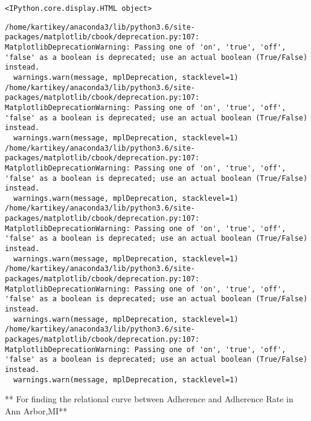 \documentclass[11pt]{article}
\begin{document}
    
    
    \begin{verbatim}
<IPython.core.display.HTML object>
    \end{verbatim}

    
    \begin{Verbatim}[commandchars=\\\{\}]
/home/kartikey/anaconda3/lib/python3.6/site-packages/matplotlib/cbook/deprecation.py:107: MatplotlibDeprecationWarning: Passing one of 'on', 'true', 'off', 'false' as a boolean is deprecated; use an actual boolean (True/False) instead.
  warnings.warn(message, mplDeprecation, stacklevel=1)
/home/kartikey/anaconda3/lib/python3.6/site-packages/matplotlib/cbook/deprecation.py:107: MatplotlibDeprecationWarning: Passing one of 'on', 'true', 'off', 'false' as a boolean is deprecated; use an actual boolean (True/False) instead.
  warnings.warn(message, mplDeprecation, stacklevel=1)
/home/kartikey/anaconda3/lib/python3.6/site-packages/matplotlib/cbook/deprecation.py:107: MatplotlibDeprecationWarning: Passing one of 'on', 'true', 'off', 'false' as a boolean is deprecated; use an actual boolean (True/False) instead.
  warnings.warn(message, mplDeprecation, stacklevel=1)
/home/kartikey/anaconda3/lib/python3.6/site-packages/matplotlib/cbook/deprecation.py:107: MatplotlibDeprecationWarning: Passing one of 'on', 'true', 'off', 'false' as a boolean is deprecated; use an actual boolean (True/False) instead.
  warnings.warn(message, mplDeprecation, stacklevel=1)
/home/kartikey/anaconda3/lib/python3.6/site-packages/matplotlib/cbook/deprecation.py:107: MatplotlibDeprecationWarning: Passing one of 'on', 'true', 'off', 'false' as a boolean is deprecated; use an actual boolean (True/False) instead.
  warnings.warn(message, mplDeprecation, stacklevel=1)
/home/kartikey/anaconda3/lib/python3.6/site-packages/matplotlib/cbook/deprecation.py:107: MatplotlibDeprecationWarning: Passing one of 'on', 'true', 'off', 'false' as a boolean is deprecated; use an actual boolean (True/False) instead.
  warnings.warn(message, mplDeprecation, stacklevel=1)

    \end{Verbatim}

    ** For finding the relational curve between Adherence and Adherence Rate
in Ann Arbor,MI**
\end{document}
